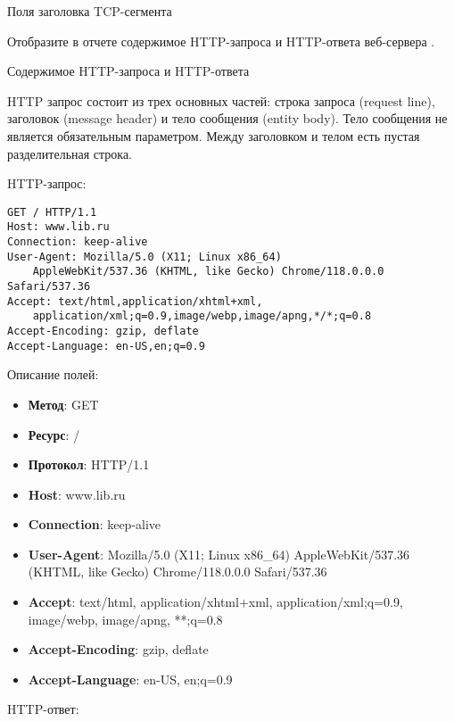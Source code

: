 \begin{image}
	\caption{Поля заголовка TCP-сегмента}
	\label{fig:wrsh:tcp}
\end{image}

Отобразите в отчете содержимое HTTP-запроса
и HTTP-ответа веб-сервера .

\begin{image}
	\caption{Содержимое HTTP-запроса и HTTP-ответа}
	\label{fig:wrsh:http}
\end{image}

HTTP запрос состоит из трех основных частей:
строка запроса (request line), заголовок (message header)
и тело сообщения (entity body).
Тело сообщения не является обязательным параметром.
Между заголовком и телом есть пустая разделительная строка.

HTTP-запрос:

\begin{verbatim}
GET / HTTP/1.1
Host: www.lib.ru
Connection: keep-alive
User-Agent: Mozilla/5.0 (X11; Linux x86_64)
	AppleWebKit/537.36 (KHTML, like Gecko) Chrome/118.0.0.0 Safari/537.36
Accept: text/html,application/xhtml+xml,
	application/xml;q=0.9,image/webp,image/apng,*/*;q=0.8
Accept-Encoding: gzip, deflate
Accept-Language: en-US,en;q=0.9
\end{verbatim}

Описание полей:

\begin{itemize}
    \item \textbf{Метод}: GET
    \item \textbf{Ресурс}: /
    \item \textbf{Протокол}: HTTP/1.1
    \item \textbf{Host}: www.lib.ru
    \item \textbf{Connection}: keep-alive
    \item \textbf{User-Agent}: Mozilla/5.0 (X11; Linux x86\_64)
		AppleWebKit/537.36 (KHTML, like Gecko) Chrome/118.0.0.0 Safari/537.36
    \item \textbf{Accept}: text/html, application/xhtml+xml,
		application/xml;q=0.9, image/webp, image/apng, *\/*;q=0.8
    \item \textbf{Accept-Encoding}: gzip, deflate
    \item \textbf{Accept-Language}: en-US, en;q=0.9
\end{itemize}

HTTP-ответ:

